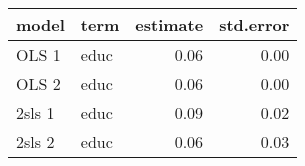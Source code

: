 \begin{tabular}{llrr}
  \hline
model & term & estimate & std.error \\ 
  \hline
OLS 1 & educ & 0.06 & 0.00 \\ 
  OLS 2 & educ & 0.06 & 0.00 \\ 
  2sls 1 & educ & 0.09 & 0.02 \\ 
  2sls 2 & educ & 0.06 & 0.03 \\ 
   \hline
\end{tabular}
